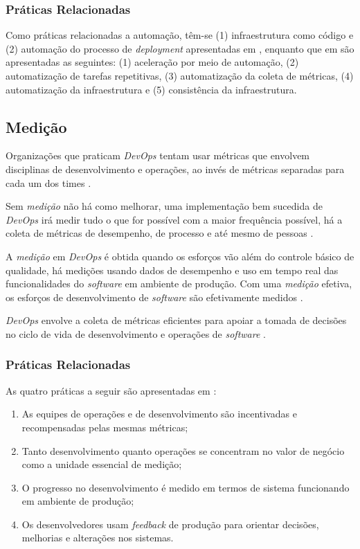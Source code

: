 \subsubsection{Práticas Relacionadas}

Como práticas relacionadas a automação, têm-se (1) infraestrutura como código
e (2) automação do processo de \textit{deployment} apresentadas em
\cite{extending_dimensions}, enquanto que em \cite{characterizing_devops} são
apresentadas as seguintes: (1) aceleração por meio de automação, (2)
automatização de tarefas repetitivas, (3) automatização da coleta de métricas,
(4) automatização da infraestrutura e (5) consistência da infraestrutura.

\subsection{Medição}

Organizações que praticam \textit{DevOps} tentam usar métricas que envolvem
disciplinas de desenvolvimento e operações, ao invés de métricas separadas
para cada um dos times \cite{qualitative_devops_journalsw_17}.

Sem \emph{medição} não há como melhorar, uma implementação bem sucedida de
\textit{DevOps} irá medir tudo o que for possível com a maior frequência
possível, há a coleta de métricas de desempenho, de processo e até mesmo de
pessoas \cite{what_devops_means_2010}.

A \emph{medição} em \textit{DevOps} é obtida quando os esforços vão além do
controle básico de qualidade, há medições usando dados de desempenho e uso em
tempo real das funcionalidades do \textit{software} em ambiente de produção.
Com uma \emph{medição} efetiva, os esforços de desenvolvimento de
\textit{software} são efetivamente medidos \cite{dimensions_of_devops}.

\textit{DevOps} envolve a coleta de métricas eficientes para apoiar a tomada
de decisões no ciclo de vida de desenvolvimento e operações de
\textit{software} \cite{characterizing_devops}.

\subsubsection{Práticas Relacionadas}

As quatro práticas a seguir são apresentadas em \cite{extending_dimensions}:

\begin{enumerate}
\item As equipes de operações e de desenvolvimento são incentivadas e
recompensadas pelas mesmas métricas;
\item Tanto desenvolvimento quanto operações se concentram no valor de negócio
como a unidade essencial de medição;
\item O progresso no desenvolvimento é medido em termos de sistema
funcionando em ambiente de produção;
\item Os desenvolvedores usam \textit{feedback} de produção para orientar
decisões, melhorias e alterações nos sistemas.
\end{enumerate}

